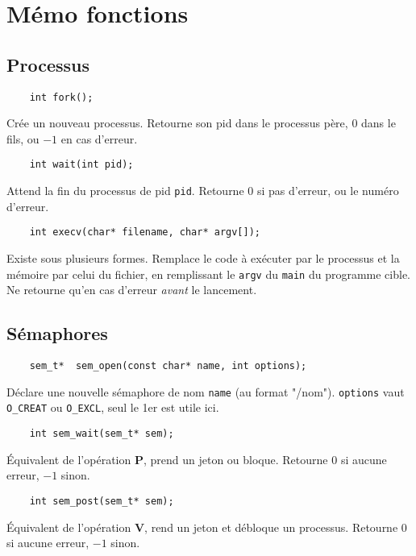 \documentclass[9pt,twocolumn,a4paper]{article}
\begin{document}
\section{Mémo fonctions}

\subsection{Processus}

\begin{lstlisting}
    int fork();
\end{lstlisting}

Cr\'ee un nouveau processus.
Retourne son pid dans le processus p\`ere, $0$ dans le fils, ou $-1$ en cas d'erreur.

\begin{lstlisting}
    int wait(int pid);
\end{lstlisting}

Attend la fin du processus de pid \texttt{pid}.
Retourne 0 si pas d'erreur, ou le num\'ero d'erreur.

\begin{lstlisting}
    int execv(char* filename, char* argv[]);
\end{lstlisting}

Existe sous plusieurs formes.
Remplace le code à exécuter par le processus et la mémoire par celui du fichier, en remplissant le \texttt{argv} du \texttt{main} du programme cible.
Ne retourne qu'en cas d'erreur \emph{avant} le lancement.

\subsection{Sémaphores}

\begin{lstlisting}
    sem_t*  sem_open(const char* name, int options);
\end{lstlisting}
Déclare une nouvelle sémaphore de nom \texttt{name} (au format "/nom"). 
\texttt{options} vaut \texttt{O\_CREAT} ou \texttt{O\_EXCL}, seul le 1er est utile ici.


\begin{lstlisting}
    int sem_wait(sem_t* sem);
\end{lstlisting}
\'Equivalent de l'opération \textbf{P}, prend un jeton ou bloque.
Retourne $0$ si aucune erreur, $-1$ sinon.


\begin{lstlisting}
    int sem_post(sem_t* sem);
\end{lstlisting}
\'Equivalent de l'opération \textbf{V}, rend un jeton et débloque un processus.
Retourne $0$ si aucune erreur, $-1$ sinon.
\end{document}
